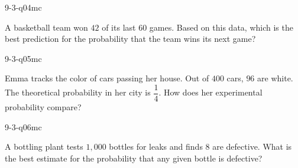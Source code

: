 \begin{practiceQuestion}{9-3-q04}{mc}
\begin{questionText}
A basketball team won $42$ of its last $60$ games. Based on this data, which is the best prediction for the probability that the team wins its next game?
\end{questionText}
\end{practiceQuestion}

\begin{practiceQuestion}{9-3-q05}{mc}
\begin{questionText}
Emma tracks the color of cars passing her house. Out of $400$ cars, $96$ are white. The theoretical probability in her city is $\dfrac{1}{4}$. How does her experimental probability compare?
\end{questionText}
\end{practiceQuestion}

\begin{practiceQuestion}{9-3-q06}{mc}
\begin{questionText}
A bottling plant tests $1{,}000$ bottles for leaks and finds $8$ are defective. What is the best estimate for the probability that any given bottle is defective?
\end{questionText}
\end{practiceQuestion}

